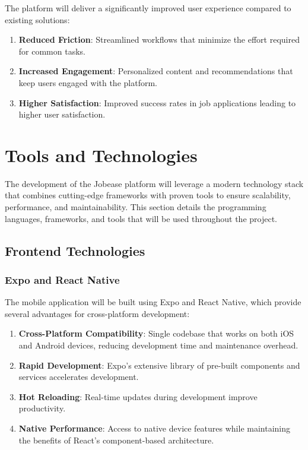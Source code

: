 \documentclass[12pt,a4paper]{report}
\begin{document}
The platform will deliver a significantly improved user experience compared to existing solutions:

\begin{enumerate}
    \item \textbf{Reduced Friction}: Streamlined workflows that minimize the effort required for common tasks.
    \item \textbf{Increased Engagement}: Personalized content and recommendations that keep users engaged with the platform.
    \item \textbf{Higher Satisfaction}: Improved success rates in job applications leading to higher user satisfaction.
\end{enumerate}

\chapter{Tools and Technologies}

The development of the Jobease platform will leverage a modern technology stack that combines cutting-edge frameworks with proven tools to ensure scalability, performance, and maintainability. This section details the programming languages, frameworks, and tools that will be used throughout the project.

\section*{Frontend Technologies}

\subsection*{Expo and React Native}

The mobile application will be built using Expo and React Native, which provide several advantages for cross-platform development:

\begin{enumerate}
    \item \textbf{Cross-Platform Compatibility}: Single codebase that works on both iOS and Android devices, reducing development time and maintenance overhead.
    \item \textbf{Rapid Development}: Expo's extensive library of pre-built components and services accelerates development.
    \item \textbf{Hot Reloading}: Real-time updates during development improve productivity.
    \item \textbf{Native Performance}: Access to native device features while maintaining the benefits of React's component-based architecture.
\end{enumerate}
\end{document}
